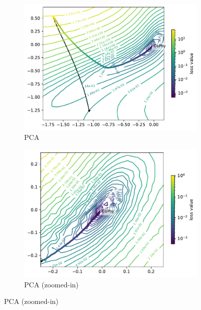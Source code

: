 \documentclass[letterpaper]{article} %
\begin{document}
            
               \begin{figure}[htbp]
              \centering
              \begin{subfigure}[b]{0.3\textwidth}
                \includegraphics[width=\textwidth]{figures/round3/Cophy_PCA/directions.h5_proj_cos_phy_total.h5_total_phy_loss_2dcontour_proj.pdf}
                \caption{PCA}
                \label{fig:PCAvsAE_outPCA}
              \end{subfigure}
              \hfill
             \begin{subfigure}[b]{0.3\textwidth}
                \includegraphics[width=\textwidth]{figures/round3/Cophy_PCA_zoomed/cophyzoomedfixed.pdf}
                \caption{PCA (zoomed-in)}

\end{subfigure}
\end{figure}
\end{document}
